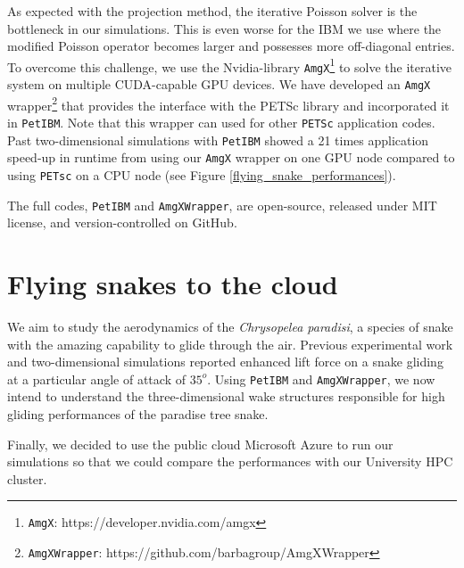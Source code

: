 \documentclass[preprint, 1p]{elsarticle}
\begin{document}
As expected with the projection method, the iterative Poisson solver is the bottleneck in our simulations.
This is even worse for the IBM we use where the modified Poisson operator becomes larger and possesses more off-diagonal entries.
To overcome this challenge, we use the Nvidia-library \texttt{AmgX}\footnote{\texttt{AmgX}: https://developer.nvidia.com/amgx} to solve the iterative system on multiple CUDA-capable GPU devices.
We have developed an \texttt{AmgX} wrapper\footnote{\texttt{AmgXWrapper}: https://github.com/barbagroup/AmgXWrapper} that provides the interface with the PETSc library and incorporated it in \texttt{PetIBM}.
Note that this wrapper can used for other \texttt{PETSc} application codes.
Past two-dimensional simulations with \texttt{PetIBM} showed a 21 times application speed-up in runtime from using our \texttt{AmgX} wrapper on one GPU node compared to using \texttt{PETsc} on a CPU node (see Figure \ref{flying_snake_performances}).

The full codes, \texttt{PetIBM} and \texttt{AmgXWrapper}, are open-source, released under MIT license, and version-controlled on GitHub.


\section{Flying snakes to the cloud}

We aim to study the aerodynamics of the \textit{Chrysopelea paradisi}, a species of snake with the amazing capability to glide through the air.
Previous experimental work \cite{Holden_et_al_2014} and two-dimensional simulations \cite{Krishnan_et_al_2014} reported enhanced lift force on a snake gliding at a particular angle of attack of $35^o$.
Using \texttt{PetIBM} and \texttt{AmgXWrapper}, we now intend to understand the three-dimensional wake structures responsible for high gliding performances of the paradise tree snake.

Finally, we decided to use the public cloud Microsoft Azure to run our simulations so that we could compare the performances with our University HPC cluster.

\end{document}
